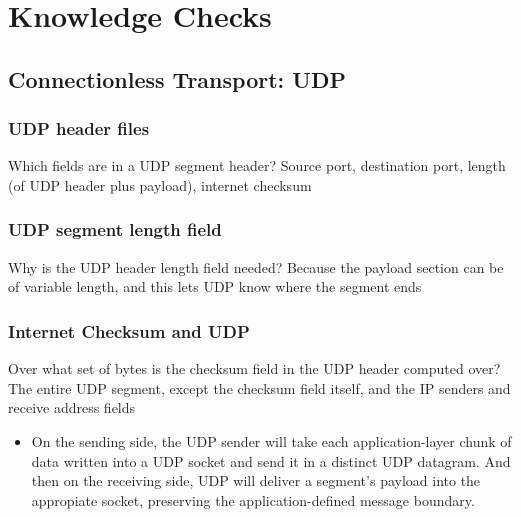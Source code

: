 \section*{Knowledge Checks}

\subsection*{Connectionless Transport: UDP}
    \subsubsection*{UDP header files}
    \noindent Which fields are in a UDP segment header?
    Source port, destination port, length (of UDP header plus payload), internet checksum

    \subsubsection*{UDP segment length field}
    \noindent Why is the UDP header length field needed?
    Because the payload section can be of variable length, and this lets UDP know where the
    segment ends
    
    \subsubsection*{Internet Checksum and UDP}
    \noindent Over what set of bytes is the checksum field in the UDP header computed over?
    The entire UDP segment, except the checksum field itself, and the IP senders and receive
    address fields
    \begin{itemize}
        \item On the sending side, the UDP sender will take each application-layer chunk of data written into a UDP
        socket and send it in a distinct UDP datagram. And then on the receiving side, UDP will deliver a segment's
        payload into the appropiate socket, preserving the application-defined message boundary.
    \end{itemize}

